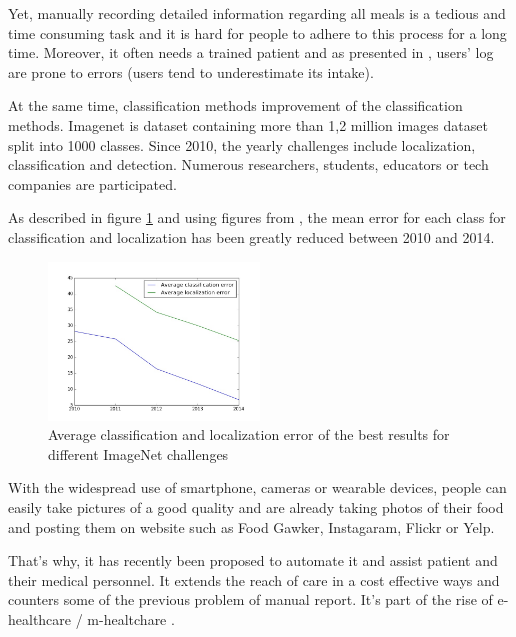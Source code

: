 Yet, manually recording detailed information regarding all meals is a tedious and time consuming task and it is hard for people to adhere to this process for a long time. Moreover, it often needs a trained patient and as presented in \cite{Lichtman1992}, users' log are prone to errors (users tend to underestimate its intake).

At the same time, classification methods improvement of the classification methods. Imagenet is dataset containing more than 1,2 million images dataset split into 1000 classes. Since 2010, the yearly challenges include localization, classification and detection. Numerous researchers, students, educators or tech companies are participated.

As described in figure \ref{fig:imagenet_results} and using figures from \cite{Russakovsky2015}, the 
mean error for each class for classification and localization has been greatly reduced between 2010 and 2014.

\begin{figure}[h]
    \centering
    \includegraphics[width=0.5\textwidth,  height=0.455\textwidth ]{img/imagenet}
    \caption{Average classification and localization error of the best results for different ImageNet challenges}
    \label{fig:imagenet_results}
\end{figure}

With the widespread use of smartphone, cameras or wearable devices, people can easily take pictures of a good quality and are already taking photos of their food and posting them on website such as Food Gawker, Instagaram, Flickr or Yelp.

That's why, it has recently been proposed to automate it and assist patient and their medical personnel. It extends the reach of care in a cost effective ways and counters some of the previous problem of manual report. It's part of the rise of e-healthcare / m-healtchare \cite{Hillestad2005, Menachemi2011}.

